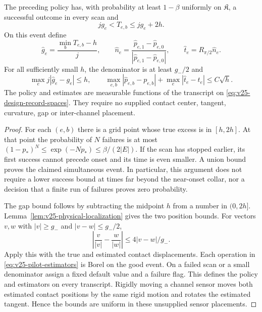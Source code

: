 \begin{theorem}
\label{thm:v25-observable-calibration}
\label{lem:v24-global-centering-pilot}
The preceding policy has, with probability at least \(1-\beta\) uniformly
on \(\mathfrak K\), a successful outcome in every scan and
\[
             jg_e<T_{e,b}\le jg_e+2h.
\]
On this event define
\begin{equation}\label{eq:v25-pilot-estimators}
 \widehat g_e=\frac{\min_bT_{e,b}-h}{j},\qquad
 \widehat n_e=\frac{\widehat p_{e,1}-\widehat p_{e,0}}
                   {|\widehat p_{e,1}-\widehat p_{e,0}|},\qquad
 \widehat t_e=R_{\pi/2}\widehat n_e.
\end{equation}
For all sufficiently small \(h\), the denominator is at least \(g_-/2\)
and
\begin{equation}\label{eq:v25-pilot-error}
 \max_e j|\widehat g_e-g_e|\le h,\qquad
 \max_{e,b}|\widehat p_{e,b}-p_{e,b}|
       +\max_e|\widehat t_e-t_e|\le C\sqrt h.
\end{equation}
The policy and estimates are measurable functions of the transcript on
\eqref{eq:v25-design-record-spaces}.  They require no supplied contact
center, tangent, curvature, gap or inter-channel placement.
\end{theorem}

\begin{proof}
For each \((e,b)\) there is a grid point whose true excess is in
\([h,2h]\).  At that point the probability of \(N\) failures is at most
\((1-p_*)^N\le\exp(-Np_*)\le\beta/(2|E|)\).  If the scan has stopped
earlier, its first success cannot precede onset and its time is even smaller.
A union bound proves the claimed simultaneous event.  In particular, this
argument does not require a lower success bound at times far beyond the
near-onset collar, nor a decision that a finite run of failures proves zero
probability.

The gap bound follows by subtracting the midpoint \(h\) from a number in
\((0,2h]\).  Lemma~\ref{lem:v25-physical-localization} gives the two
position bounds.  For vectors \(v,w\) with \(|v|\ge g_-\) and
\(|v-w|\le g_-/2\),
\[
 \left|\frac v{|v|}-\frac w{|w|}\right|
                         \le 4|v-w|/g_-.
\]
Apply this with the true and estimated contact displacements.  Each operation
in \eqref{eq:v25-pilot-estimators} is Borel on the good event.  On a failed
scan or a small denominator assign a fixed default value and a failure flag.
This defines the policy and estimators on every transcript.  Rigidly moving
a channel sensor moves both estimated contact positions by the same rigid
motion and rotates the estimated tangent.  Hence the bounds are uniform in
these unsupplied sensor placements.
\end{proof}

